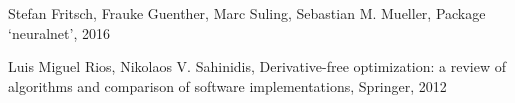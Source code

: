 \begin{thebibliography}{1}

 Stefan Fritsch, Frauke Guenther, Marc Suling, Sebastian M. Mueller, Package ‘neuralnet’, 2016 

Luis Miguel Rios, Nikolaos V. Sahinidis, Derivative-free optimization: a review of algorithms and comparison of software implementations, Springer, 2012
\end{thebibliography}
